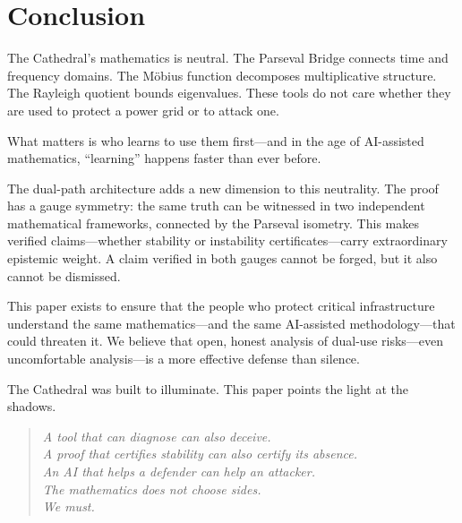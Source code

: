 \documentclass[11pt,a4paper]{article}
\begin{document}
\section{Conclusion}

The Cathedral's mathematics is neutral. The Parseval Bridge connects
time and frequency domains. The M\"obius function decomposes
multiplicative structure. The Rayleigh quotient bounds eigenvalues.
These tools do not care whether they are used to protect a power
grid or to attack one.

What matters is who learns to use them first---and in the age of
AI-assisted mathematics, ``learning'' happens faster than ever before.

The dual-path architecture adds a new dimension to this neutrality.
The proof has a gauge symmetry: the same truth can be witnessed in
two independent mathematical frameworks, connected by the Parseval
isometry. This makes verified claims---whether stability or
instability certificates---carry extraordinary epistemic weight.
A claim verified in both gauges cannot be forged, but it also
cannot be dismissed.

This paper exists to ensure that the people who protect critical
infrastructure understand the same mathematics---and the same
AI-assisted methodology---that could threaten it. We believe that
open, honest analysis of dual-use risks---even uncomfortable
analysis---is a more effective defense than silence.

The Cathedral was built to illuminate. This paper points the light
at the shadows.

\begin{quote}
\emph{A tool that can diagnose can also deceive.\\
A proof that certifies stability can also certify its absence.\\
An AI that helps a defender can help an attacker.\\
The mathematics does not choose sides.\\
We must.}
\end{quote}

\vspace{0.5cm}
\end{document}
